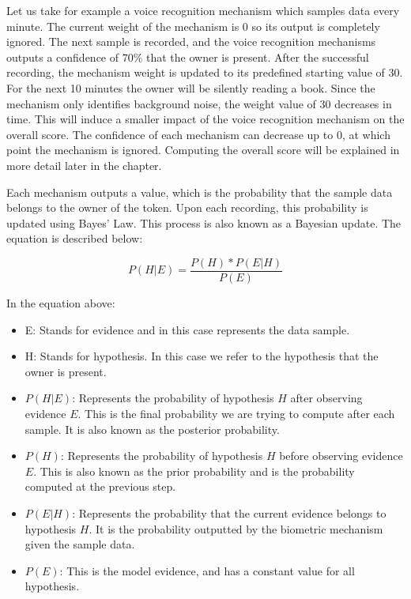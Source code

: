 Let us take for example a voice recognition mechanism which samples data every minute. The current weight of the mechanism is 0 so its output is completely ignored. The next sample is recorded, and the voice recognition mechanisms outputs a confidence of $70\%$ that the owner is present. After the successful recording, the mechanism weight is updated to its predefined starting value of 30. For the next 10 minutes the owner will be silently reading a book. Since the mechanism only identifies background noise, the weight value of 30 decreases in time. This will induce a smaller impact of the voice recognition mechanism on the overall score. The confidence of each mechanism can decrease up to 0, at which point the mechanism is ignored. Computing the overall score will be explained in more detail later in the chapter.

Each mechanism outputs a value, which is the probability that the sample data belongs to the owner of the token. Upon each recording, this probability is updated using Bayes' Law. This process is also known as a Bayesian update. The equation is described below:

\begin{equation} 
\label{eq:bayes1}
P(H|E) = \frac{P(H) * P(E|H)}{P(E)}
\end{equation}

In the equation above:
\begin{itemize} 
	\item E: Stands for evidence and in this case represents the data sample.
	\item H: Stands for hypothesis. In this case we refer to the hypothesis that the owner is present.
	\item $P(H|E)$: Represents the probability of hypothesis $H$ after observing evidence $E$. This is the final probability we are trying to compute after each sample. It is also known as the posterior probability. 
	\item $P(H)$: Represents the probability of hypothesis $H$ before observing evidence $E$. This is also known as the prior probability and is the probability computed at the previous step.
	\item $P(E|H)$: Represents the probability that the current evidence belongs to hypothesis $H$. It is the probability outputted by the biometric mechanism given the sample data.
	\item $P(E)$: This is the model evidence, and has a constant value for all hypothesis.
\end{itemize}

